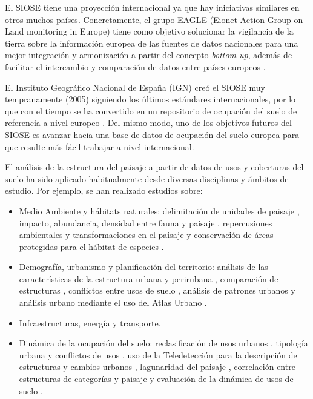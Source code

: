 El SIOSE tiene una proyección internacional ya que hay iniciativas similares en otros muchos países. Concretamente, el grupo EAGLE (Eionet Action Group on Land monitoring in Europe) tiene como objetivo solucionar la vigilancia de la tierra sobre la información europea de las fuentes de datos nacionales para una mejor integración y armonización a partir del concepto \textit{bottom-up}, además de facilitar el intercambio y comparación de datos entre países europeos \citep{Arnold2013}. 

El Instituto Geográfico Nacional de España (IGN) creó el SIOSE muy tempranamente (2005) siguiendo los últimos estándares internacionales, por lo que con el tiempo se ha convertido en un repositorio de ocupación del suelo de referencia a nivel europeo \citep{EquipoTecnicoNacionalSIOSE2015}. Del mismo modo, uno de los objetivos futuros del SIOSE es avanzar hacia una base de datos de ocupación del suelo europea para que resulte más fácil trabajar a nivel internacional.

El análisis de la estructura del paisaje a partir de datos de usos y coberturas del suelo ha sido aplicado habitualmente desde diversas disciplinas y ámbitos de estudio. Por ejemplo, se han realizado estudios sobre:

\begin{itemize}
\item Medio Ambiente y hábitats naturales: delimitación de unidades de paisaje \citep{Gine2014}, impacto, abundancia, densidad entre fauna y paisaje \citep{Hamilton2009,Hebeisen2008,Brennan2005}, repercusiones ambientales y transformaciones en el paisaje \citep{GimenezFont2010} y conservación de áreas protegidas para el hábitat de especies \citep{Lin2014}.
\item Demografía, urbanismo y planificación del territorio: análisis de las características de la estructura urbana y perirubana \citep{Aguilera2011,Jacquin2008}, comparación de estructuras \citep{Blaschke1999}, conflictos entre usos de suelo \citep{Tudor2014}, análisis de patrones urbanos \citep{Aguilera2010} y análisis urbano mediante el uso del Atlas Urbano \citep{Prastacos2017}.
\item Infraestructuras, energía y transporte.
\item Dinámica de la ocupación del suelo: reclasificación de usos urbanos \citep{VanderKwast2011}, tipología urbana y conflictos de usos \citep{Dunk2011,Aguilera2012}, uso de la Teledetección para la descripción de estructuras y cambios urbanos \citep{Herold2002}, lagunaridad del paisaje \citep{Roces-Diaz2014}, correlación entre estructuras de categorías y paisaje \citep{Liu2016} y evaluación de la dinámica de usos de suelo \citep{Rodriguez-Rodriguez2017}.
\end{itemize}

